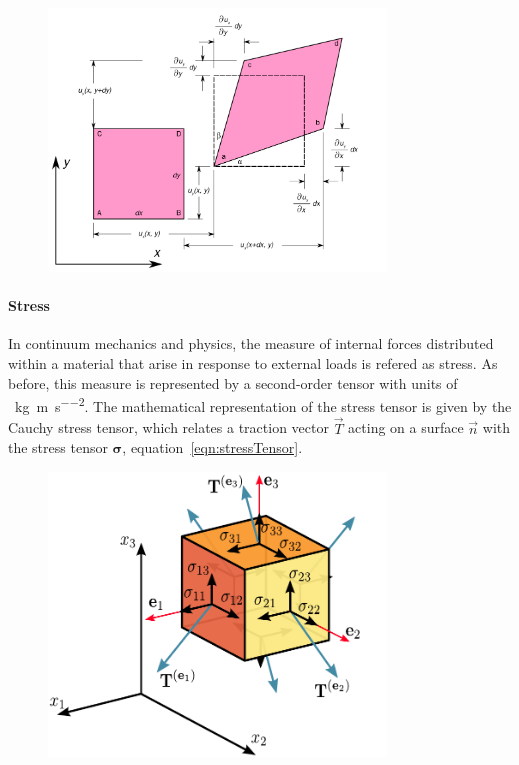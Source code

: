 \begin{figure}[ht!]
    \centering
    \includegraphics[width=0.8\textwidth]{figs/2D_geometric_strain.png}
\end{figure}

\paragraph{Stress} In continuum mechanics and physics, the measure of internal forces distributed within a material that arise in response to external loads is refered as stress.
As before, this measure is represented by a second-order tensor with units of \SI{}{\kilo\gram\per\meter\per\second\squared}.
The mathematical representation of the stress tensor is given by the Cauchy stress tensor, which relates a traction vector $\vec{T}$ acting on a surface $\vec{n}$ with the stress tensor $\bm{\sigma}$, equation~\eqref{eqn:stressTensor}.


\begin{figure}[ht!]
    \centering
    \includegraphics[width=0.8\textwidth]{figs/Components_stress_tensor_cartesian.pdf}
\end{figure}



